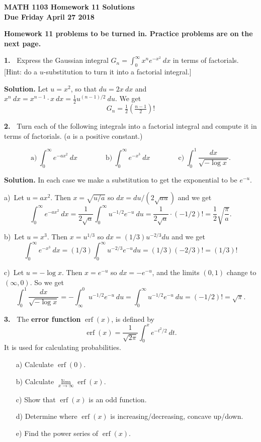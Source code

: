 \documentclass[12pt]{article}
\theoremstyle{definition}
\theoremstyle{remark}
\theoremstyle{definition}
\newenvironment{Solution}{\noindent\textbf{Solution.}}{}
\DeclareMathOperator{\erf}{erf}
\begin{document}
  

{\bf MATH 1103 Homework 11 Solutions}\\
{\bf Due Friday April 27 2018}



 {\bf Homework 11 problems to be turned in. Practice problems are on the next page.}




{\bf 1.\ } Express the Gaussian integral $G_{n}=\int_0^{\infty} x^n e^{-x^2}\ dx$ in terms of factorials. [Hint: do a $u$-substitution to turn it into a factorial integral.]

\begin{Solution}
Let $u=x^2$, so that $du=2x\ dx$ and $x^n\ dx=x^{n-1}\cdot x\ dx=\frac{1}{2}u^{(n-1)/2}\ du.$
We get
\[G_n=\tfrac{1}{2}\left(\tfrac{n-1}{2}\right)!\]
\end{Solution}



{\bf 2.\ } Turn each of the following integrals into a factorial integral and compute it in terms of factorials. ($a$ is a positive constant.)

\[ \text{a)}\ \int_0^\infty e^{-ax^2}\ dx \qquad\qquad
 \text{b)}\ \int_0^\infty e^{-x^3}\ dx\qquad \qquad
 \text{c)}\ \int_0^1\frac{dx}{\sqrt{-\log x}}.
\]


\begin{Solution} 
In each case we make a substitution to get the exponential to be $e^{-u}$. 

a)\ Let $u=ax^2$. Then $x=\sqrt{u/a}$ so $dx=du/(2\sqrt{au})$ and we get
\[\int_0^\infty e^{-ax^2}\ dx=\frac{1}{2\sqrt{a}}\int_0^\infty u^{-1/2}e^{-u}\ du=
\frac{1}{2\sqrt{a}}\cdot (-1/2)!=\frac{1}{2}\sqrt{\frac{\pi}{a}}.
\]

b)\ Let $u=x^3$. Then $x=u^{1/3}$  so $dx=(1/3)u^{-2/3} du$ and we get
\[ \int_0^\infty e^{-x^3}\ dx=(1/3)\int_0^\infty u^{-2/3}e^{-u} du=
(1/3)(-2/3)!=(1/3)!
\]

c)\ Let $u=-\log x$. Then $x=e^{-u}$ so $dx=-e^{-u}$,  and the limits $(0,1)$ change to $(\infty,0)$. So we get 
\[\int_0^1\frac{dx}{\sqrt{-\log x}}=-\int_\infty^0 u^{-1/2} e^{-u}\ du
=\int_0^\infty u^{-1/2} e^{-u}\ du=(-1/2)!=\sqrt{\pi}.
\]
\end{Solution}

\newpage
{\bf 3.\ } The {\bf error function} $\erf(x)$, is defined by 
\[\erf(x)=\frac{1}{\sqrt{2\pi}}\int_0^x e^{-t^2/2}\ dt.\]
It is used for calculating probabilities. 

\begin{enumerate}
\item[a)] Calculate $\erf(0)$. 
\item[b)] Calculate $\lim\limits_{x\to\infty}\erf(x)$.
\item[c)] Show that $\erf(x)$ is an odd function. 
\item[d)] Determine where $\erf(x)$ is increasing/decreasing, concave up/down. 
\item[e)] Find the power series of $\erf(x)$. 
\end{enumerate}
\end{document}
